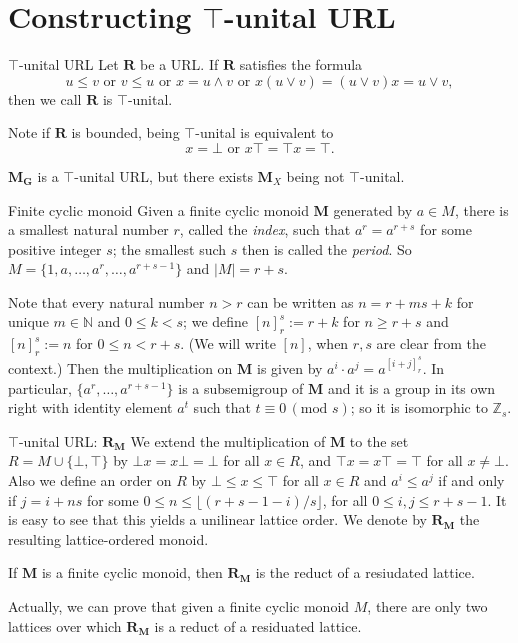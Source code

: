 \documentclass[professionalfont, handout, 10pt]{beamer} %
\theoremstyle{plain}
\theoremstyle{definition}
\newcommand{\m}[1]{{\mathbf {#1} }}
\newcommand{\jn}{\vee}
\newcommand{\mt}{\wedge}
\begin{document}
\section{Constructing $\top$-unital URL}

\begin{frame}{$\top$-unital URL}
    Let $\m R$ be a URL.
    If $\m R$ satisfies the formula
    \[
        u \leq v \text{ or } v \leq u \text{ or } x = u \mt v \text{ or } x(u \jn v) = (u \jn v)x = u \jn v,
    \]
    then we call $\m R$ is $\top$-unital.

    Note if $\m R$ is bounded, being $\top$-unital is equivalent to
    \[
        x = \bot \text{ or } x \top = \top x = \top.
    \]

    $\m M_{\m G}$ is a $\top$-unital URL, but there exists $\m M_X$ being not $\top$-unital.
\end{frame}

\begin{frame}{Finite cyclic monoid}
    Given a finite cyclic monoid $\mathbf{M}$ generated by $a \in M$, there is a smallest natural number $r$, called the \emph{index}, such that $a^r = a^{r+s}$ for some  positive integer $s$; the smallest such $s$ then is called the \emph{period}.
    So $M = \{1, a, \dots, a^r, \dots, a^{r+s-1}\}$ and $|M|=r+s$.\pause
    
    Note that every natural number $n > r$ can be written as $n=r+ms+k$ for unique $m \in \mathbb{N}$ and $0 \leq k <s$; we define $[n]_r^s:= r+k$ for $n \geq r+s$ and $[n]_r^s:= n$ for $0 \leq n < r+s$.
    (We will write $[n]$, when $r,s$ are clear from the context.)
    Then the multiplication on $\m M$ is given by $a^i \cdot a^j =a^{[i+j]_r^s}$.
    In particular, $\{a^r, \dots, a^{r+s-1}\}$ is a subsemigroup of $\m M$ and it is a  group in its own right with identity element $a^t$ such that $t \equiv 0 \, (\text{mod } s)$; so it is isomorphic to $\mathbb{Z}_s$.
\end{frame}

\begin{frame}{$\top$-unital URL: $\m R_{\m M}$}
    We extend the multiplication of $\m M$ to the set $R = M \cup \{\bot, \top\}$ by $\bot x = x \bot = \bot$ for all $x \in R$, and $\top x = x \top = \top$ for all $x \not = \bot$.
    Also we define an order on $R$ by $\bot \leq x \leq \top$ for all $x \in R$ and
    $a^i \leq a^j$ if and only if $j = i+ns$ for some $0 \leq n \leq \lfloor (r+s-1-i)/s \rfloor$, for all $0 \leq i, j \leq r+s-1$.
    It is easy to see that this yields a unilinear lattice order.
    We denote by $\m R_{\m M}$ the resulting lattice-ordered monoid.

    \begin{block}{}
        If $\m M$ is a finite cyclic monoid, then $\mathbf{R}_{\m M}$ is the reduct of a resiudated lattice.
    \end{block}
    \pause

    Actually, we can prove that given a finite cyclic monoid $M$, there are only two lattices over which $\m R_{\m M}$ is a reduct of a residuated lattice.
\end{frame}
\end{document}
